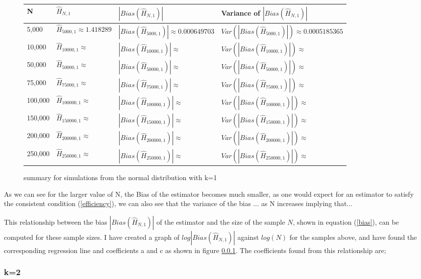 \documentclass{article}
\begin{document}
\begin{figure}
 \begin{adjustwidth}{-2cm}{}
\begin{tabular}{|l|l|l|l|}
\hline
N & $\hat{H}_{N, 1}$ & $|Bias(\hat{H}_{N, 1})|$ & Variance of $|Bias(\hat{H}_{N, 1})|$ \\
\hline
5,000 & $\hat{H}_{5000, 1} \approx 1.418289$ & $|Bias(\hat{H}_{5000, 1})| \approx 0.000649703$ & $Var(|Bias(\hat{H}_{5000, 1})|) \approx 0.0005185365 $\\
10,000 & $\hat{H}_{10000, 1} \approx $ & $|Bias(\hat{H}_{10000, 1})| \approx $ & $Var(|Bias(\hat{H}_{10000, 1})|) \approx $\\
50,000 & $\hat{H}_{50000, 1} \approx $ & $|Bias(\hat{H}_{50000, 1})| \approx $ & $Var(|Bias(\hat{H}_{50000, 1})|) \approx $\\
75,000 & $\hat{H}_{75000, 1} \approx $ & $|Bias(\hat{H}_{75000, 1})| \approx $ & $Var(|Bias(\hat{H}_{75000, 1})|) \approx $\\
100,000 & $\hat{H}_{100000, 1} \approx $ & $|Bias(\hat{H}_{100000, 1})| \approx $ & $Var(|Bias(\hat{H}_{100000, 1})|) \approx $\\
150,000 & $\hat{H}_{150000, 1} \approx $ & $|Bias(\hat{H}_{150000, 1})| \approx $ & $Var(|Bias(\hat{H}_{150000, 1})|) \approx $\\
200,000 & $\hat{H}_{200000, 1} \approx $ & $|Bias(\hat{H}_{200000, 1})| \approx $ & $Var(|Bias(\hat{H}_{200000, 1})|) \approx $\\
250,000 & $\hat{H}_{250000, 1} \approx $ & $|Bias(\hat{H}_{250000, 1})| \approx $ & $Var(|Bias(\hat{H}_{250000, 1})|) \approx $\\
\hline
\end{tabular}
\caption{\label{fig:normalK=1} summary for simulations from the normal distribution with k=1}
 \end{adjustwidth}
\end{figure}

As we can see for the larger value of N, the Bias of the estimator becomes much smaller, as one would expect for an estimator to satisfy the consistent condition (\ref{efficiency}), we can also see that the variance of the bias ... as N increases implying that...

This relationship between the bias $|Bias(\hat{H}_{N, 1})|$ of the estimator and the size of the sample $N$, shown in equation (\ref{bias}), can be computed for these sample sizes. I have created a graph of $log|Bias(\hat{H}_{N, 1})|$ against $log(N)$ for the samples above, and have found the corresponding regression line and coefficients a and c as shown in figure \ref{}. The coefficients found from this relationship are;

\subsubsection{k=2}
\end{document}

